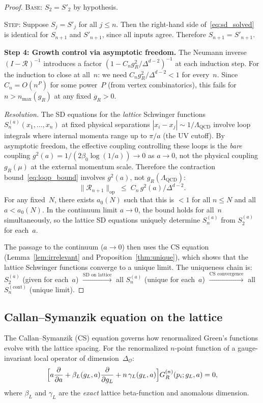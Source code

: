 \documentclass[11pt,a4paper]{article}
\theoremstyle{plain}
\theoremstyle{definition}
\theoremstyle{remark}
\begin{document}
\begin{proof}
\noindent\textsc{Base}: $S_2 = S'_2$ by hypothesis.

\noindent\textsc{Step}: Suppose $S_j = S'_j$ for all
$j \leq n$.  Then the right-hand side
of~\eqref{eq:sd_solved} is identical for
$S_{n+1}$ and $S'_{n+1}$, since all inputs agree.
Therefore $S_{n+1} = S'_{n+1}$.

\smallskip
\textbf{Step 4: Growth control via asymptotic freedom.}
The Neumann inverse $(I - \mathcal{R})^{-1}$ introduces
a factor $(1 - C_n g_R^2/\Delta^{d-2})^{-1}$ at each
induction step.  For the induction to close at all~$n$:
we need $C_n g_R^2/\Delta^{d-2} < 1$ for every~$n$.
Since $C_n = O(n^P)$ for some power~$P$ (from vertex
combinatorics), this fails for $n > n_{\max}(g_R)$
at any fixed $g_R > 0$.

\emph{Resolution.}
The SD equations for the \emph{lattice} Schwinger
functions $S_n^{(a)}(x_1, \ldots, x_n)$ at fixed
physical separations $|x_i - x_j| \sim 1/\Lambda_{\mathrm{QCD}}$
involve loop integrals where internal momenta range
up to $\pi/a$ (the UV cutoff).
By asymptotic freedom, the effective coupling
controlling these loops is the \emph{bare} coupling
$g^2(a) = 1/(2\beta_0\log(1/a)) \to 0$ as $a \to 0$,
not the physical coupling $g_R(\mu)$ at the
external momentum scale.
Therefore the contraction
bound~\eqref{eq:loop_bound} involves $g^2(a)$,
not $g_R(\Lambda_{\mathrm{QCD}})$:
\[
  \|\mathcal{R}_{n+1}\|_{\mathrm{op}}
  \;\leq\; C_n\,g^2(a) / \Delta^{d-2}.
\]
For any fixed~$N$, there exists $a_0(N)$ such that
this is $< 1$ for all $n \leq N$ and all $a < a_0(N)$.
In the continuum limit $a \to 0$, the bound holds
for all~$n$ simultaneously, so the lattice SD
equations uniquely determine $S_n^{(a)}$ from $S_2^{(a)}$
for each~$a$.

The passage to the continuum ($a \to 0$) then uses
the CS equation (Lemma~\ref{lem:irrelevant} and
Proposition~\ref{thm:unique}), which shows that
the lattice Schwinger functions converge to a unique
limit.  The uniqueness chain is:
$S_2^{(a)}$ (given for each~$a$)
$\xrightarrow{\text{SD on lattice}}$
all $S_n^{(a)}$ (unique for each~$a$)
$\xrightarrow{\text{CS convergence}}$
all $S_n^{(\mathrm{cont})}$ (unique limit).
\end{proof}

\subsection{Callan--Symanzik equation on the lattice}

The Callan--Symanzik (CS) equation governs how renormalized
Green's functions evolve with the lattice spacing.  For the
renormalized $n$-point function of a gauge-invariant local
operator of dimension~$\Delta_{\mathcal{O}}$:
\begin{equation}\label{eq:cs_lattice}
  \Bigl[a\frac{\partial}{\partial a}
  + \beta_L(g_L, a)\frac{\partial}{\partial g_L}
  + n\,\gamma_L(g_L, a)\Bigr]
  G_R^{(n)}(p_i; g_L, a) = 0,
\end{equation}
where $\beta_L$ and $\gamma_L$ are the \emph{exact} lattice
beta-function and anomalous dimension.
\end{document}

